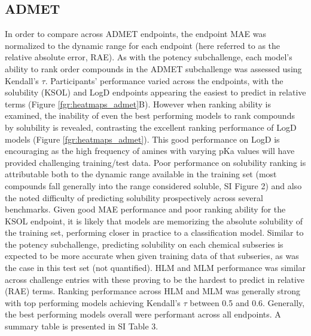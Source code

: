 \documentclass[journal=jcim,manuscript=article]{achemso}
\begin{document}
\subsection{ADMET}
In order to compare across ADMET endpoints, the endpoint MAE was normalized to the dynamic range for each endpoint (here referred to as the relative absolute error, RAE). As with the potency subchallenge, each model's ability to rank order compounds in the ADMET subchallenge was assessed using Kendall's $\tau$. Participants' performance varied across the endpoints, with the solubility (KSOL) and LogD endpoints appearing the easiest to predict in relative terms (Figure \ref{fgr:heatmaps_admet}B). However when ranking ability is examined, the inability of even the best performing models to rank compounds by solubility is revealed, contrasting the excellent ranking performance of LogD models (Figure \ref{fgr:heatmaps_admet}). This good performance on LogD is encouraging as the high frequency of amines with varying pKa values will have provided challenging training/test data. Poor performance on solubility ranking is attributable both to the dynamic range available in the training set (most compounds fall generally into the range considered soluble, SI Figure 2) and also the noted difficulty of predicting solubility prospectively across several benchmarks\cite{llompart_minoletti_baybekov_horvath_marcou_varnek_2024}. Given good MAE performance and poor ranking ability for the KSOL endpoint, it is likely that models are memorizing the absolute solubility of the training set, performing closer in practice to a classification model. Similar to the potency subchallenge, predicting solubility on each chemical subseries is expected to be more accurate when given training data of that subseries, as was the case in this test set (not quantified). HLM and MLM performance was similar across challenge entries with these proving to be the hardest to predict in relative (RAE) terms. Ranking performance across HLM and MLM was generally strong with top performing models achieving Kendall's $\tau$ between 0.5 and 0.6. Generally, the best performing models overall were performant across all endpoints. A summary table is presented in SI Table 3.
\end{document}
